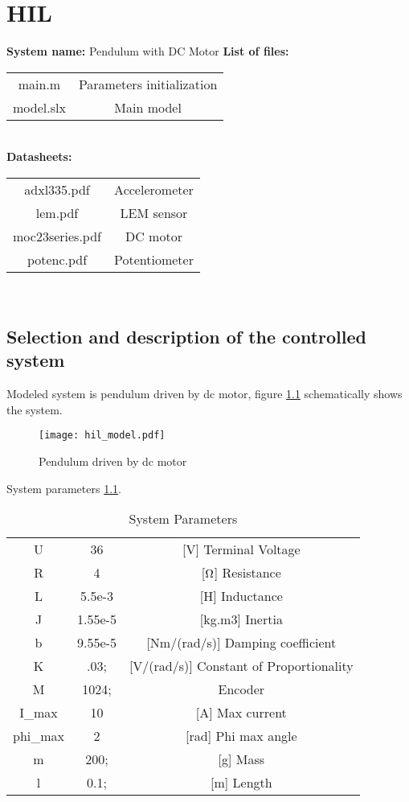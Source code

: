 \chapter{HIL}

\textbf{System name:}  Pendulum with DC Motor
\textbf{List of files:} 
\begin{tabular}{ |c|c| }
    \hline
    main.m & Parameters initialization \\
    model.slx & Main model \\
    \hline
\end{tabular} \\
\textbf{Datasheets:}
\begin{tabular}{ |c|c| }
    \hline
    adxl335.pdf & Accelerometer \\
    lem.pdf & LEM sensor \\
    moc23series.pdf & DC motor \\
    potenc.pdf & Potentiometer \\
    \hline
\end{tabular} \\

\section{Selection and description of the controlled system}
Modeled system is pendulum driven by dc motor, figure \ref{fig:hil_model}
schematically shows the system. 

\begin{figure}[htb!]
    \centering
    \texttt{[image: hil\_model.pdf]}
    \caption{Pendulum driven by dc motor}
    \label{fig:hil_model}
\end{figure}

System parameters \ref{tab:params}.
\begin{table}[h]
    \centering
    \begin{tabular}{|c|c|c|}
        \hline
        U & 36 & [V] Terminal Voltage \\
        R & 4  & [$\rm\Omega$]  Resistance \\
        L & 5.5e-3  &    [H] Inductance \\
        J & 1.55e-5 &    [kg.m3] Inertia \\
        b & 9.55e-5 &    [Nm/(rad/s)] Damping coefficient \\
        K & .03;    &    [V/(rad/s)] Constant of Proportionality \\
        M & 1024;   & Encoder \\
        I\_max & 10 &    [A] Max current \\
        phi\_max & 2&  [rad] Phi max angle  \\
        m & 200;    &    [g] Mass \\
        l & 0.1;    &   [m] Length \\
        \hline
    \end{tabular}
    \caption{System Parameters}
    \label{tab:params}
\end{table}


